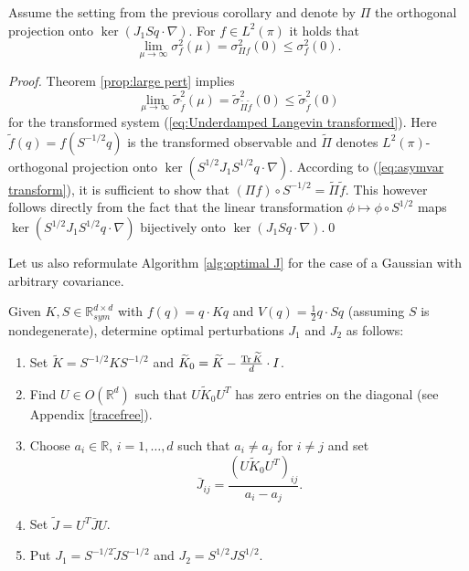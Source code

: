 \begin{corollary}
	\label{cor:limit_asym_var}
	Assume the setting from the previous corollary and denote by $\Pi$
	the orthogonal projection onto $\ker(J_{1}Sq\cdot\nabla)$. For $f\in L^{2}(\pi)$
	it holds that
	\[
	\lim_{\mu\rightarrow\infty}\sigma_{f}^{2}(\mu)=\sigma_{\Pi f}^{2}(0)\le\sigma_{f}^{2}(0).
	\]
\end{corollary}
\begin{proof}
	Theorem \ref{prop:large pert} implies 
	\[
	\lim_{\mu\rightarrow\infty}\widetilde{\sigma}_{\widetilde{f}}^{2}(\mu)=\widetilde{\sigma}_{\widetilde{\Pi}\widetilde{f}}^{2}(0)\le\widetilde{\sigma}_{\widetilde{f}}^{2}(0)
	\]
	for the transformed system (\ref{eq:Underdamped Langevin transformed}).
	Here $\widetilde{f}(q)=f(S^{-1/2}q)$ is the transformed observable and
	$\widetilde{\Pi}$ denotes $L^{2}(\pi)$-orthogonal projection onto $\ker(S^{1/2}J_{1}S^{1/2}q\cdot\nabla)$.
	According to (\ref{eq:asymvar transform}), it is sufficient to show
	that $(\Pi f)\circ S^{-1/2}=\widetilde{\Pi}\widetilde{f}$. This however follows
	directly from the fact that the linear transformation $\phi\mapsto\phi\circ S^{1/2}$
	maps $\ker(S^{1/2}J_{1}S^{1/2}q\cdot\nabla)$ bijectively onto $\ker(J_{1}Sq\cdot\nabla)$.\qed
\end{proof}
Let us also reformulate Algorithm \ref{alg:optimal J} for the case of a Gaussian with arbitrary covariance.
\begin{algorithm}
	\label{alg:optimal J general}Given $K,S\in\mathbb{R}_{sym}^{d\times d}$
	with $f(q)=q\cdot Kq$ and $V(q)=\frac{1}{2}q\cdot Sq$ (assuming $S$ is nondegenerate), determine optimal perturbations $J_{1}$
	and $J_{2}$ as follows:
	\begin{enumerate}
		\item Set $\widetilde{K}=S^{-1/2}KS^{-1/2}$ and $\widetilde{K}_{0}=\widetilde{K}-\frac{\operatorname{Tr}\widetilde{K}}{d}\cdot I$.
		\item Find $U\in O(\mathbb{R}^{d})$ such that $U\widetilde{K}_{0}U^{T}$ has
		zero entries on the diagonal (see Appendix \ref{tracefree}).
		\item Choose $a_{i}\in\mathbb{R}$, $i=1,\ldots,d$ such that $a_{i}\ne a_{j}$
		for $i\ne j$ and set 
		\[
		\bar{J}_{ij}=\frac{(U\widetilde{K}_{0}U^{T})_{ij}}{a_{i}-a_{j}}.
		\]
		\item
		Set $\widetilde{J}=U^{T}\bar{J}U$.
		\item Put $J_{1}=S^{-1/2}\widetilde{J}S^{-1/2}$ and $J_{2}=S^{1/2}JS^{1/2}$.
	\end{enumerate}
\end{algorithm}
